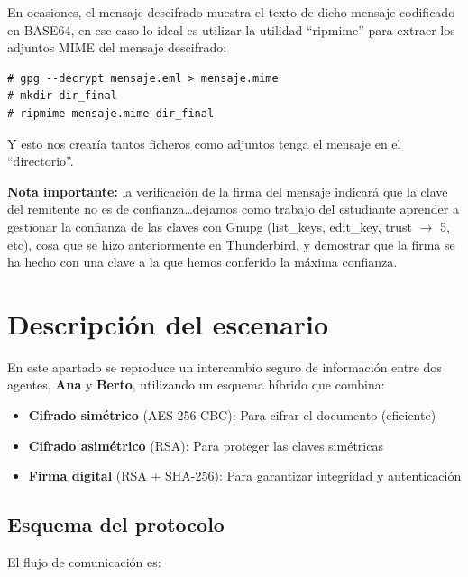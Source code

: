 En ocasiones, el mensaje descifrado muestra el texto de dicho mensaje codificado en BASE64, en ese
caso lo ideal es utilizar la utilidad ``ripmime'' para extraer los adjuntos MIME del mensaje descifrado:
\begin{lstlisting}
# gpg --decrypt mensaje.eml > mensaje.mime
# mkdir dir_final
# ripmime mensaje.mime dir_final
\end{lstlisting}
Y esto nos crearía tantos ficheros como adjuntos tenga el mensaje en el ``directorio''.

\textbf{Nota importante:} la verificación de la firma del mensaje indicará que la clave del remitente no es
de confianza\dots dejamos como trabajo del estudiante aprender a gestionar la confianza de las
claves con Gnupg (list\_keys, edit\_key, trust $\rightarrow$ 5, etc), cosa que se hizo anteriormente en
Thunderbird, y demostrar que la firma se ha hecho con una clave a la que hemos conferido la
máxima confianza.

\section{Descripción del escenario}

En este apartado se reproduce un intercambio seguro de información entre dos agentes, \textbf{Ana} y \textbf{Berto}, utilizando un esquema híbrido que combina:

\begin{itemize}[label=\textbullet]
    \item \textbf{Cifrado simétrico} (AES-256-CBC): Para cifrar el documento (eficiente)
    \item \textbf{Cifrado asimétrico} (RSA): Para proteger las claves simétricas
    \item \textbf{Firma digital} (RSA + SHA-256): Para garantizar integridad y autenticación
\end{itemize}

\subsection{Esquema del protocolo}

El flujo de comunicación es:

